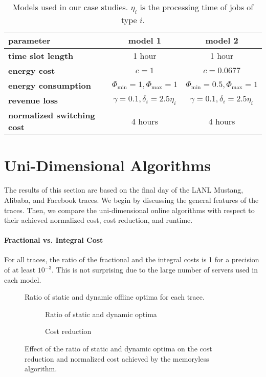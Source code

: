 \begin{table}
    \centering
    \begin{tabular}{>{\bfseries\centering}l|c|c}
        parameter & model 1 & model 2 \\\hline
        time slot length & 1 hour & 1 hour \\
        energy cost & $c=1$ & $c=0.0677$ \\
        energy consumption & $\Phi_{\text{min}}=1, \Phi_{\text{max}}=1$ & $\Phi_{\text{min}}=0.5, \Phi_{\text{max}}=1$ \\
        revenue loss & $\gamma = 0.1, \delta_i = 2.5 \eta_i$ & $\gamma = 0.1, \delta_i = 2.5 \eta_i$ \\
        normalized switching cost & 4 hours & 4 hours \\
    \end{tabular}
    \caption{Models used in our case studies. $\eta_i$ is the processing time of jobs of type $i$.}
    \label{tab:model}
\end{table}

\section{Uni-Dimensional Algorithms}

The results of this section are based on the final day of the LANL Mustang, Alibaba, and Facebook traces. We begin by discussing the general features of the traces. Then, we compare the uni-dimensional online algorithms with respect to their achieved normalized cost, cost reduction, and runtime.

\paragraph{Fractional vs. Integral Cost} For all traces, the ratio of the fractional and the integral costs is 1 for a precision of at least $10^{-3}$. This is not surprising due to the large number of servers used in each model.

\begin{figure}
    \centering
    
    \caption{Ratio of static and dynamic offline optima for each trace.}\label{fig:case_studies:ud:opt_vs_opts}
\end{figure}

\begin{figure}
    \begin{subfigure}[b]{.5\linewidth}
    \resizebox{\textwidth}{!}{}
    \caption{Ratio of static and dynamic optima}\label{fig:case_studies:ud:opt_vs_opts_against_mean_cost_reduction}
    \end{subfigure}
    \begin{subfigure}[b]{.5\linewidth}
    \resizebox{\textwidth}{!}{}
    \caption{Cost reduction}\label{fig:case_studies:ud:opt_vs_opts_against_normalized_cost}
    \end{subfigure}
    \caption{Effect of the ratio of static and dynamic optima on the cost reduction and normalized cost achieved by the memoryless algorithm.}
\end{figure}

